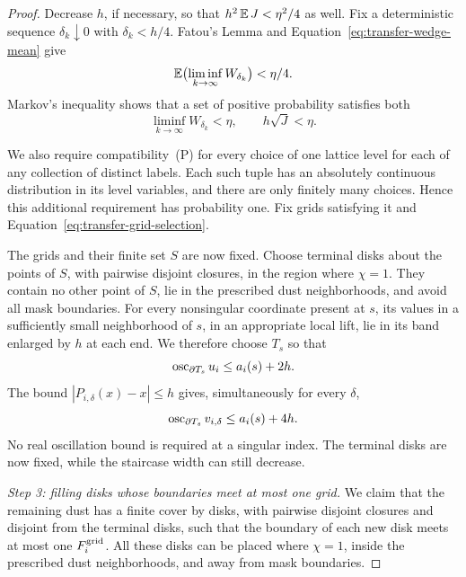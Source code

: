 \begin{proof}
Decrease $h$, if necessary, so that $h^2\operatorname{\mathbb E} J<\eta^2/4$ as well.
Fix a deterministic sequence $\delta_k\downarrow0$ with
$\delta_k<h/4$.  Fatou's Lemma and
Equation~\eqref{eq:transfer-wedge-mean} give
\[
 \operatorname{\mathbb E}\bigl(\liminf_{k\to\infty}W_{\delta_k}\bigr)<\eta/4.
\]
Markov's inequality shows that a set of positive probability satisfies
both
\begin{equation}\label{eq:transfer-grid-selection}
 \liminf_{k\to\infty}W_{\delta_k}<\eta,
 \qquad h\sqrt J<\eta.
\end{equation}

We also require compatibility~(P) for every choice of one lattice
level for each of any collection of distinct labels.  Each such tuple
has an absolutely continuous distribution in its level variables, and
there are only finitely many choices.  Hence this additional requirement
has probability one.  Fix grids satisfying it and
Equation~\eqref{eq:transfer-grid-selection}.

The grids and their finite set $S$ are now fixed.  Choose terminal
disks about the points of $S$, with pairwise disjoint closures, in the
region where $\chi=1$.  They contain no other
point of $S$, lie in the prescribed dust neighborhoods, and avoid all
mask boundaries.  For every nonsingular coordinate present at $s$, its
values in a sufficiently small neighborhood of $s$, in an appropriate
local lift, lie in its band enlarged by $h$ at each end.  We therefore
choose $T_s$ so that
\[
 \operatorname{osc}_{\partial T_s}u_i\le a_i(s)+2h.
\]
The bound $|P_{i,\delta}(x)-x|\le h$ gives, simultaneously for every
$\delta$,
\begin{equation}\label{eq:transfer-terminal-oscillation}
 \operatorname{osc}_{\partial T_s}v_{i,\delta}\le a_i(s)+4h.
\end{equation}
No real oscillation bound is required at a singular index.  The
terminal disks are now fixed, while the staircase width can still
decrease.

\smallskip\noindent
\emph{Step 3: filling disks whose boundaries meet at most one grid.}
We claim that the remaining dust has a finite cover by disks, with
pairwise disjoint closures and disjoint from the terminal disks, such
that the boundary of each new disk meets at most one
$F_i^{\rm grid}$.  All these disks can be placed where $\chi=1$,
inside the prescribed dust neighborhoods, and away from mask
boundaries.


\end{proof}
